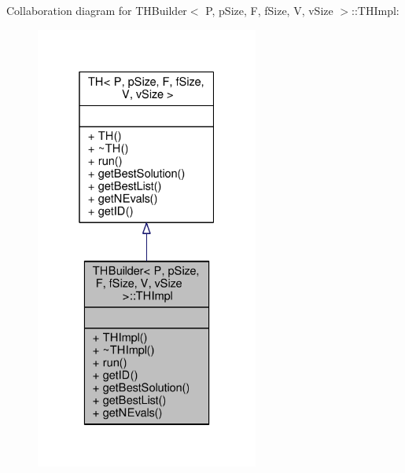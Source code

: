 Collaboration diagram for T\+H\+Builder$<$ P, p\+Size, F, f\+Size, V, v\+Size $>$\+:\+:T\+H\+Impl\+:\nopagebreak
\begin{figure}[H]
\begin{center}
\leavevmode
\includegraphics[width=208pt]{classTHBuilder_1_1THImpl__coll__graph}
\end{center}
\end{figure}
